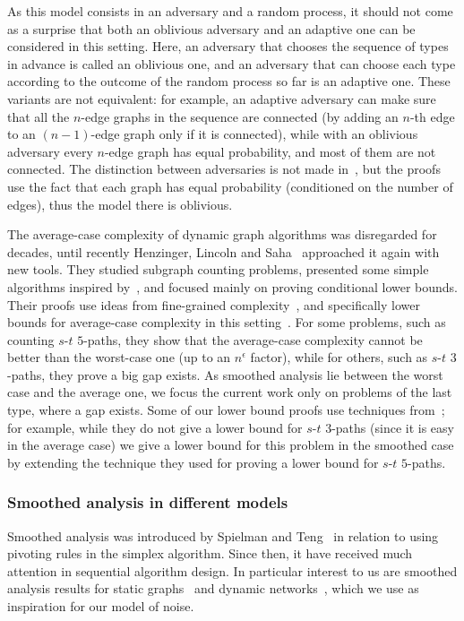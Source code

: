 \documentclass[letter,11pt]{article}
\newcommand{\paths}[3]{${#1}$-${#2}$ ${#3}$-paths\xspace}
\begin{document}
As this model consists in an adversary and a random process, it should not come as a surprise that both an oblivious adversary and an adaptive one can be considered in this setting.
Here, an adversary that chooses the sequence of types in advance is called an oblivious one, and an adversary that can choose each type according to the outcome of the random process so far is an adaptive one.
These variants are not equivalent:
for example, an adaptive adversary can make sure that all the $n$-edge graphs in the sequence are connected (by adding an $n$-th edge to an $(n-1)$-edge graph only if it is connected), while with an oblivious adversary every $n$-edge graph has equal probability, and most of them are not connected.
The distinction between adversaries is not made in~\cite{AlbertsH98}, but the proofs use the fact that each graph has equal probability (conditioned on the number of edges), thus the model there is oblivious.
 
 
The average-case complexity of dynamic graph algorithms was disregarded for decades, until recently Henzinger, Lincoln and Saha~\cite{HLS22}
approached it again with new tools.
They studied subgraph counting problems, 
presented some simple algorithms inspired by~\cite{AlbertsH98},
and focused mainly on proving conditional lower bounds.
Their proofs use ideas from fine-grained complexity~\cite{HenzingerKNS15}, and specifically lower bounds for average-case complexity in this setting~\cite{DalirrooyfardLW20,Boix-AdseraBB19}.
For some problems, such as counting \paths st5, they show that the average-case complexity cannot be better than the worst-case one (up to an $n^\epsilon$ factor), while for others, such as 
\paths st3, they prove a big gap exists.
As smoothed analysis lie between the worst case and the average one, we focus the current work only on problems of the last type, where a gap exists.
Some of our lower bound proofs use techniques from~\cite{HLS22};
for example, while they do not give a lower bound for \paths st3 (since it is easy in the average case) we give a lower bound for this problem in the smoothed case
by extending the technique they used for proving a lower bound for \paths st5.

\subsubsection{Smoothed analysis in different models}
Smoothed analysis was introduced by Spielman and Teng~\cite{SpielmanT04} in relation to using pivoting rules in the simplex algorithm. 
Since then, it have received much attention in sequential algorithm design.
In particular interest to us are smoothed analysis results for static graphs~\cite{krivelevich2006smoothed, friedrich2011smoothed,krivelevich2015smoothed} 
and dynamic networks~\cite{DFGN18,MPS20,GMPS21,DFGN22},
which we use as inspiration for our model of noise.
\end{document}
